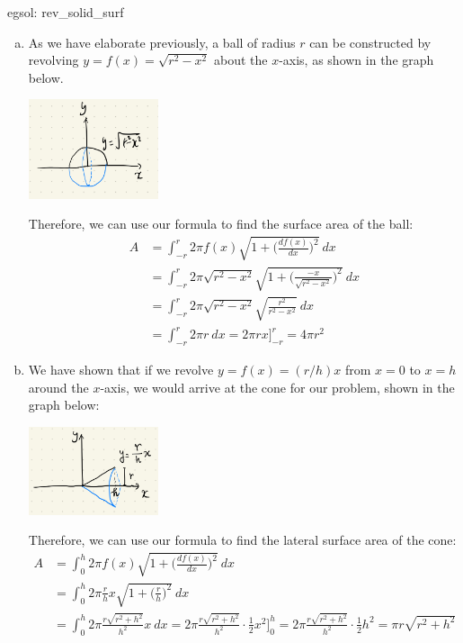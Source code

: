 \begin{egsol}[]{egsol: rev_solid_surf}
    \begin{enumerate}[a)]
        \item As we have elaborate previously, a ball of radius $r$ can be constructed by revolving $y = f(x) = \sqrt{r^2-x^2}$ about the $x$-axis, as shown in the graph below. 
        \begin{center}
            \includegraphics[width = 0.3\textwidth]{figures/chap 07/rev_solid_ball.png}
        \end{center}
        Therefore, we can use our formula to find the surface area of the ball:
        \begin{align*}
            A &= \int_{-r}^r 2 \pi f(x)\sqrt{1+\Big(\frac{df(x)}{dx}\Big)^2}~dx\\
            &= \int_{-r}^r 2 \pi \sqrt{r^2-x^2}\sqrt{1+\Big(\frac{-x}{\sqrt{r^2-x^2}}\Big)^2}~dx\\
            &= \int_{-r}^r 2 \pi \sqrt{r^2-x^2}\sqrt{\frac{r^2}{r^2-x^2}}~dx\\
            &= \int_{-r}^r 2 \pi r~dx = 2 \pi r x\big]_{-r}^r = 4 \pi r^2
        \end{align*}
        \item We have shown that if we revolve $y = f(x) = (r/h)x$ from $x = 0$ to $x = h$ around the $x$-axis, we would arrive at the cone for our problem, shown in the graph below:
        \begin{center}
            \includegraphics[width = 0.3\textwidth]{figures/chap 07/rev_solid_cone.png}
        \end{center}
        \allowdisplaybreaks
        Therefore, we can use our formula to find the lateral surface area of the cone:
        \begin{align*}
            A &= \int_0^h 2 \pi f(x)\sqrt{1+\Big(\frac{df(x)}{dx}\Big)^2}~dx\\
            &= \int_0^h 2 \pi \frac{r}{h} x \sqrt{1+\Big(\frac{r}{h}\Big)^2}~dx\\
            &= \int_0^h 2 \pi \frac{r\sqrt{r^2+h^2}}{h^2} x~dx = 2 \pi \frac{r\sqrt{r^2+h^2}}{h^2} \cdot \frac{1}{2}x^2\Big]_0^h = 2 \pi \frac{r\sqrt{r^2+h^2}}{h^2} \cdot \frac{1}{2}h^2 = \pi r \sqrt{r^2+h^2}
        \end{align*}
    \end{enumerate}
\end{egsol}

